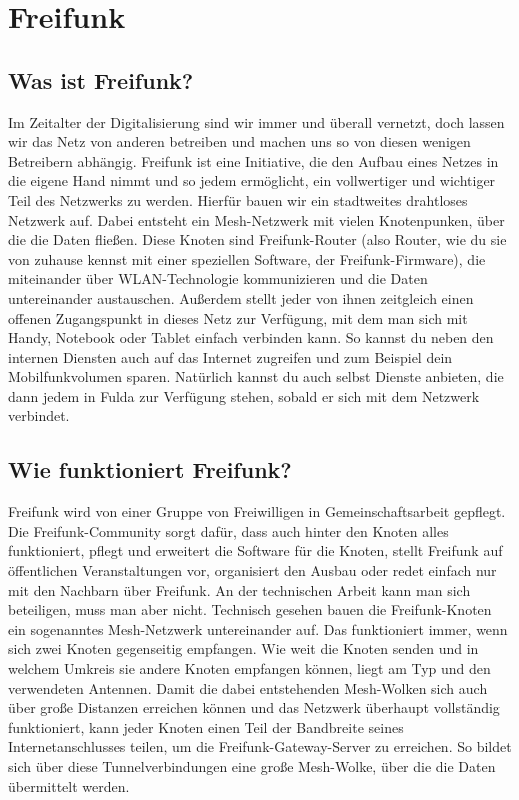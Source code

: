 \section{Freifunk}
\subsection{Was ist Freifunk?}
Im Zeitalter der Digitalisierung sind wir immer und überall vernetzt, doch lassen wir das Netz von anderen betreiben und machen uns so von diesen wenigen Betreibern abhängig. Freifunk ist eine Initiative, die den Aufbau eines Netzes in die eigene Hand nimmt und so jedem ermöglicht, ein vollwertiger und wichtiger Teil des Netzwerks zu werden. Hierfür bauen wir ein stadtweites drahtloses Netzwerk auf. Dabei entsteht ein Mesh-Netzwerk mit vielen Knotenpunken, über die die Daten fließen. Diese Knoten sind Freifunk-Router (also Router, wie du sie von zuhause kennst mit einer speziellen Software, der Freifunk-Firmware), die miteinander über WLAN-Technologie kommunizieren und die Daten untereinander austauschen. Außerdem stellt jeder von ihnen zeitgleich einen offenen Zugangspunkt in dieses Netz zur Verfügung, mit dem man sich mit Handy, Notebook oder Tablet einfach verbinden kann. So kannst du neben den internen Diensten auch auf das Internet zugreifen und zum Beispiel dein Mobilfunkvolumen sparen. Natürlich kannst du auch selbst Dienste anbieten, die dann jedem in Fulda zur Verfügung stehen, sobald er sich mit dem Netzwerk verbindet.

\subsection{Wie funktioniert Freifunk?}
Freifunk wird von einer Gruppe von Freiwilligen in Gemeinschaftsarbeit gepflegt. Die Freifunk-Community sorgt dafür, dass auch hinter den Knoten alles funktioniert, pflegt und erweitert die Software für die Knoten, stellt Freifunk auf öffentlichen Veranstaltungen vor, organisiert den Ausbau oder redet einfach nur mit den Nachbarn über Freifunk. An der technischen Arbeit kann man sich beteiligen, muss man aber nicht.
Technisch gesehen bauen die Freifunk-Knoten ein sogenanntes Mesh-Netzwerk untereinander auf. Das funktioniert immer, wenn sich zwei Knoten gegenseitig empfangen. Wie weit die Knoten senden und in welchem Umkreis sie andere Knoten empfangen können, liegt am Typ und den verwendeten Antennen. Damit die dabei entstehenden Mesh-Wolken sich auch über große Distanzen erreichen können und das Netzwerk überhaupt vollständig funktioniert, kann jeder Knoten einen Teil der Bandbreite seines Internetanschlusses teilen, um die Freifunk-Gateway-Server zu erreichen. So bildet sich über diese Tunnelverbindungen eine große Mesh-Wolke, über die die Daten übermittelt werden.

